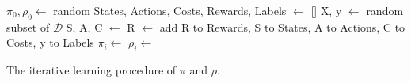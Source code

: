 \begin{algorithm}[h] \label{alg:learning}

\SetAlgoLined
{}
\BlankLine
$\pi_0, \rho_0 \leftarrow$ random\;
States, Actions, Costs, Rewards, Labels $\leftarrow$ []\;
 {
    X, y $\leftarrow$ random subset of $\mathcal{D}$\;
    S, A, C $\leftarrow$ \;
    R $\leftarrow$ \;
    add R to Rewards, S to States, A to Actions, C to Costs, y to Labels\;
    $\pi_i \leftarrow$ \;
    $\rho_i \leftarrow$ \;
}
\caption{The iterative learning procedure of $\pi$ and $\rho$.}
\end{algorithm}




